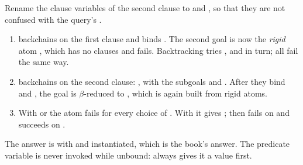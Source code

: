\begin{tutorial}
Rename the clause variables of the second  clause to  and , so that they are not
confused with the query's .
\begin{enumerate}
\item {} backchains on the first clause and  binds . The second
  goal is now the \emph{rigid} atom , which has no clauses and fails. Backtracking
  tries ,  and  in turn; all fail the same way.
\item {} backchains on the second clause:
  , with the subgoals  and .
  After they bind  and , the goal  is $\beta$-reduced to
  , which is again built from rigid atoms.
\item With  or  the atom  fails for every choice of
  . With  it gives ; then  fails on
   and  succeeds on .
\end{enumerate}
The answer is  with  and  instantiated, which is the book's answer. The predicate
variable is never invoked while unbound:  always gives it a value first.
\end{tutorial}

